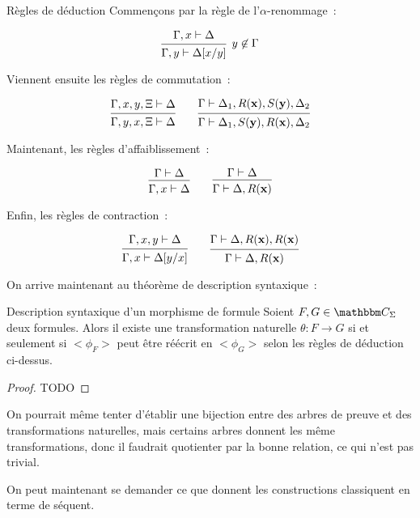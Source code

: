 \begin{defi}{Règles de déduction}
    Commençons par la règle de l'$\alpha$-renommage~:

    \[ \tproof{ \hypo{\Gamma, x\vdash \Delta}
         \infer1[$y\not\in\Gamma$]{\Gamma, y\vdash \Delta[x/y]} }\]

    Viennent ensuite les règles de commutation~:

    \[ \tproof{ \hypo{\Gamma, x, y, \Xi\vdash \Delta}
         \infer1{\Gamma, y, x, \Xi\vdash \Delta} }
       \qquad
       \tproof{ \hypo{\Gamma\vdash \Delta_1, R(\mathbf{x}), S(\mathbf{y}), \Delta_2}
         \infer1{\Gamma\vdash \Delta_1, S(\mathbf{y}), R(\mathbf{x}), \Delta_2} }
    \]

    Maintenant, les règles d'affaiblissement~:

    \[ \tproof{ \hypo{\Gamma\vdash\Delta}
         \infer1{\Gamma, x\vdash \Delta} }
       \qquad
       \tproof{ \hypo{\Gamma\vdash\Delta}
         \infer1{\Gamma\vdash\Delta,R(\mathbf{x})} }\]

    Enfin, les règles de contraction~:

    \[ \tproof{ \hypo{\Gamma,x,y\vdash\Delta}
         \infer1{\Gamma, x\vdash\Delta[y/x]} }
       \qquad
       \tproof{ \hypo{\Gamma\vdash\Delta, R(\mathbf{x}), R(\mathbf{x})}
         \infer1{\Gamma\vdash\Delta, R(\mathbf{x})} }\]

\end{defi}

On arrive maintenant au théorème de description syntaxique~:

\begin{theo}{Description syntaxique d'un morphisme de formule}
    Soient $F,G\in\C_\Sigma$ deux formules. Alors il existe une transformation
    naturelle $\theta:F\rightarrow G$ si et seulement si $<\phi_F>$ peut être réécrit
    en $<\phi_G>$ selon les règles de déduction ci-dessus.
\end{theo}

\begin{proof}
    TODO
\end{proof}

\begin{rem}
    On pourrait même tenter d'établir une bijection entre des arbres de preuve
    et des transformations naturelles, mais certains arbres donnent les même
    transformations, donc il faudrait quotienter par la bonne relation, ce qui
    n'est pas trivial.
\end{rem}

On peut maintenant se demander ce que donnent les constructions classiquent en terme
de séquent.

